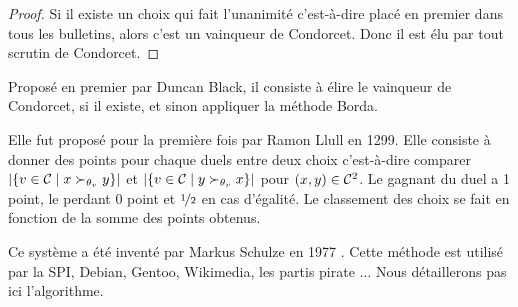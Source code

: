 \begin{proof}
	Si il existe un choix qui fait l'unanimité c'est-à-dire placé en premier dans tous les bulletins, alors c'est un vainqueur de Condorcet. Donc il est élu par tout scrutin de Condorcet.
\end{proof}

\begin{definition}
	Proposé en premier par Duncan Black, il consiste à élire le vainqueur de Condorcet, si il existe, et sinon appliquer la méthode Borda.
\end{definition}

\begin{definition}
	Elle fut proposé pour la première fois par Ramon Llull en 1299. Elle consiste à donner des points pour chaque duels entre deux choix c'est-à-dire comparer $\left|\left\{ v \in \mathcal{C} \;|\; x \succ_{\theta_v} y \right\}\right|$ et $\left|\left\{ v \in \mathcal{C} \;|\; y \succ_{\theta_v} x \right\}\right|$ pour $(x, y) \in \mathcal{C}^2$. Le gagnant du duel a 1 point, le perdant 0 point et $\nicefrac{1}{2}$ en cas d'égalité. Le classement des choix se fait en fonction de la somme des points obtenus.
\end{definition}

\begin{definition}
	Ce système a été inventé par Markus Schulze en 1977 \cite{Schulze_method}. Cette méthode est utilisé par la SPI, Debian, Gentoo, Wikimedia, les partis pirate $\ldots$ Nous détaillerons pas ici l'algorithme.
\end{definition}